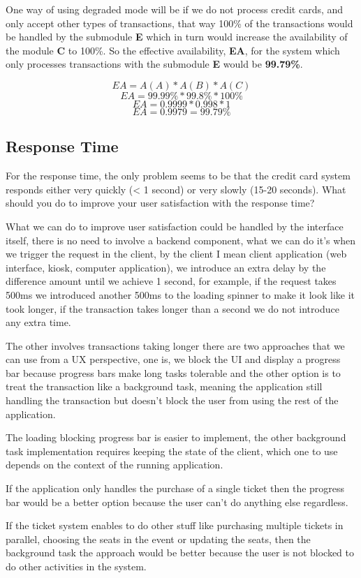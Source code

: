 \noindent
One way of using degraded mode will be if we do not process credit cards, and only
accept other types of transactions, that way 100\% of the transactions would be 
handled by the submodule \textbf{E} which in turn would increase the availability
of the module \textbf{C} to 100\%. So the effective availability, \textbf{EA}, 
for the system which only processes transactions with the 
submodule \textbf{E} would be \textbf{99.79\%}.

\[ EA = A(A) * A(B) * A(C) \]
\[ EA =  99.99\% * 99.8\% * 100\%\]
\[ EA =  0.9999 * 0.998 * 1\]
\[ EA = 0.9979 = 99.79\%\]

\pagebreak

\subsection{Response Time}
For the response time, the only problem seems to be that the credit card 
system responds either very quickly (< 1 second) or very slowly 
(15-20 seconds).  What should you do to improve your user satisfaction with 
the response time?\newline

\noindent
What we can do to improve user satisfaction could be handled by the interface 
itself, there is no need to involve a backend component, what we can do it's 
when we trigger the request in the client, by the client I mean client application 
(web interface, kiosk, computer application), we introduce an extra delay by 
the difference amount until we achieve 1 second, for example, if the request takes
500ms we introduced another 500ms to the loading spinner to make it look like 
it took longer, if the transaction takes longer than a second we do not introduce 
any extra time. \newline

\noindent 
The other involves transactions taking longer there are two approaches that we
can use from a UX perspective, one is, we block the UI and display a progress 
bar because progress bars make long tasks tolerable and the other option is 
to treat the transaction like a background task, meaning the application 
still handling the transaction but doesn't block the user from using the 
rest of the application.\newline

\noindent 
The loading blocking progress bar is easier to implement, the other background
task implementation requires keeping the state of the client, which one to use
depends on the context of the running application. \newline

\noindent
If the application only handles the purchase of a single ticket then the 
progress bar would be a better option because the user can't do anything 
else regardless. \newline

\noindent
If the ticket system enables to do other stuff like purchasing multiple 
tickets in parallel, choosing the seats in the event or updating the seats, 
then the background task the approach would be better because the user is 
not blocked to do other activities in the system.

